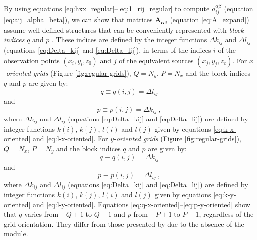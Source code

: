 \documentclass[manuscript]{geophysics}
\begin{document}
	By using equations \ref{eq:hxx_regular}--\ref{eq:1_rij_regular} to compute 
	$a^{\alpha\beta}_{ij}$ (equation \ref{eq:aij_alpha_beta}), we can show that 
	matrices $\mathbf{A_{\boldsymbol{\alpha\beta}}}$ (equation \ref{eq:A_expand}) assume
	well-defined structures that can be conveniently
	represented with \textit{block indices} $q$ and $p$ \citep{takahashi2020convolutional}.
	These indices are defined by the integer functions $\Delta k_{ij}$ and $\Delta l_{ij}$ 
	(equations \ref{eq:Delta_kij} and \ref{eq:Delta_lij}), in terms of the indices $i$ 
	of the observation points $(x_{i}, y_{i}, z_{0})$ and $j$ of the equivalent sources
	$(x_{j}, y_{j}, z_{c})$.
	For $x$-\textit{oriented grids} (Figure \ref{fig:regular-grids}), $Q = N_{y}$, $P = N_{x}$ 
	and the block indices $q$ and $p$ are given by:
	\begin{equation}
		q \equiv q(i, j) = \Delta l_{ij}
		\label{eq:q-x-oriented}
	\end{equation}
	and
	\begin{equation}
		p \equiv p(i, j) = \Delta k_{ij} \: ,
		\label{eq:p-x-oriented}
	\end{equation}
	where $\Delta k_{ij}$ and $\Delta l_{ij}$ (equations \ref{eq:Delta_kij} and \ref{eq:Delta_lij}) 
	are defined by integer functions $k(i)$, $k(j)$, $l(i)$ and $l(j)$ given by equations 
	\ref{eq:k-x-oriented} and \ref{eq:l-x-oriented}.
	For $y$-\textit{oriented grids} (Figure \ref{fig:regular-grids}), $Q = N_{x}$, $P = N_{y}$ and 
	the block indices $q$ and $p$ are given by:
	\begin{equation}
		q \equiv q(i, j) = \Delta k_{ij}
		\label{eq:q-y-oriented}
	\end{equation}
	and
	\begin{equation}
		p \equiv p(i, j) = \Delta l_{ij} \: ,
		\label{eq:p-y-oriented}
	\end{equation}
	where $\Delta k_{ij}$ and $\Delta l_{ij}$ (equations \ref{eq:Delta_kij} and \ref{eq:Delta_lij}) 
	are defined by integer functions $k(i)$, $k(j)$, $l(i)$ and $l(j)$ given by equations 
	\ref{eq:k-y-oriented} and \ref{eq:l-y-oriented}.
	Equations \ref{eq:q-x-oriented}--\ref{eq:p-y-oriented} show that $q$ varies from $-Q+1$
	to $Q-1$ and $p$ from $-P+1$ to $P-1$, regardless of the grid orientation. They differ 
	from those presented by \citet{takahashi2020convolutional} due to the absence of the module.
	
	
\end{document}
